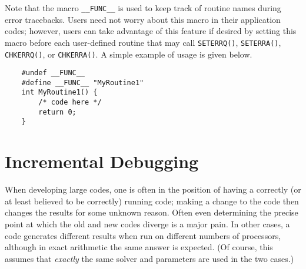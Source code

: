 Note that the macro {\tt \_\_FUNC\_\_} is used to keep track of
routine names during error tracebacks.  Users need not worry about this
macro in their application codes; however, users can take advantage of this feature
if desired by setting this macro before each user-defined routine
that may call {\tt SETERRQ()}, {\tt SETERRA()}, {\tt CHKERRQ()},
or {\tt CHKERRA()}.  A simple example of usage is given below.
\begin{verbatim}
    #undef __FUNC__  
    #define __FUNC__ "MyRoutine1"
    int MyRoutine1() { 
        /* code here */
        return 0;
    }
\end{verbatim}

\section{Incremental Debugging} 

When developing large codes, one is often in the position of having a
correctly (or at least believed to be correctly) running code; making
a change to the code then changes the results for some unknown reason.
Often even determining the precise point at which the old and new
codes diverge is a major pain.  In other cases, a code generates
different results when run on different numbers of processors,
although in exact arithmetic the same answer is expected. (Of course,
this assumes that {\em exactly} the same solver and parameters are
used in the two cases.)
 
